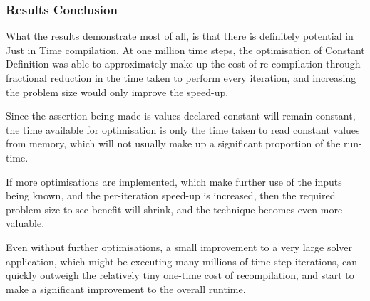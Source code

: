 \subsubsection{Results Conclusion}
What the results demonstrate most of all, is that there is definitely potential in Just in Time compilation. At one million time steps, the optimisation of Constant Definition was able to approximately make up the cost of re-compilation through fractional reduction in the time taken to perform every iteration, and increasing the problem size would only improve the speed-up.
\par
Since the assertion being made is values declared constant will remain constant, the time available for optimisation is only the time taken to read constant values from memory, which will not usually make up a significant proportion of the run-time.
\par
If more optimisations are implemented, which make further use of the inputs being known, and the per-iteration speed-up is increased, then the required problem size to see benefit will shrink, and the technique becomes even more valuable.
\par
Even without further optimisations, a small improvement to a very large solver application, which might be executing many millions of time-step iterations, can quickly outweigh the relatively tiny one-time cost of recompilation, and start to make a significant improvement to the overall runtime.
